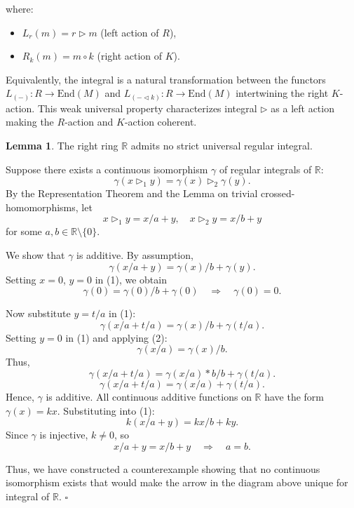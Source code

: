\documentclass[12pt]{article}
\theoremstyle{definition}
\newtheorem*{lemmastar}{Lemma}
\begin{document}
\newpage
\noindent where:
\begin{itemize}
\item $L_r(m) = r \triangleright m$ (left action of $R$),
\item $R_k(m) = m \circ k$ (right action of $K$).
\end{itemize}

Equivalently, the integral is a natural transformation between the functors $L_{(-)}: R \to \mathrm{End}(M)$ and $L_{(- \lhd k)}: R \to \mathrm{End}(M)$ intertwining the right $K$-action.  
This weak universal property characterizes integral $\triangleright$ as a left action making the $R$-action and $K$-action coherent.

\vspace{10pt}

\begin{lemmastar} The right ring $\mathbb{R}$ admits no strict universal regular integral.

\vspace{5pt}
\noindent Suppose there exists a continuous isomorphism $\gamma$ of regular integrals of $\mathbb{R}$:
\[
\gamma(x \triangleright_1 y) = \gamma(x) \triangleright_2 \gamma(y).
\]
By the Representation Theorem and the Lemma on trivial crossed-homomorphisms, let
\[
x \triangleright_1 y = x/a + y, \quad x \triangleright_2 y = x/b + y
\]
for some $a, b \in \mathbb{R}\setminus\{0\}$.

\vspace{5pt}
\noindent We show that $\gamma$ is additive. By assumption,
\begin{equation}
\gamma(x/a + y) = \gamma(x)/b + \gamma(y). \tag{1}
\end{equation}
Setting $x = 0$, $y = 0$ in (1), we obtain
\begin{equation}
\gamma(0) = \gamma(0)/b + \gamma(0) \quad \Rightarrow \quad \gamma(0) = 0. \tag{2}
\end{equation}

\noindent Now substitute $y = t/a$ in (1):
\[
\gamma(x/a + t/a) = \gamma(x)/b + \gamma(t/a).
\]
Setting $y = 0$ in (1) and applying (2):
\[
\gamma(x/a) = \gamma(x)/b.
\]
Thus,
\[
\gamma(x/a + t/a) = \gamma(x/a)*b/b + \gamma(t/a).
\]
\[
\gamma(x/a + t/a) = \gamma(x/a) + \gamma(t/a).
\]
Hence, $\gamma$ is additive. All continuous additive functions on $\mathbb{R}$ have the form $\gamma(x) = kx$. Substituting into (1):
\[
k(x/a + y) = kx/b + ky.
\]
Since $\gamma$ is injective, $k \neq 0$, so
\[
x/a + y = x/b + y \quad \Rightarrow \quad a = b.
\]

Thus, we have constructed a counterexample showing that no continuous isomorphism exists that would make the arrow in the diagram above unique for integral of $\mathbb{R}$. $\square$
\end{lemmastar}
\end{document}
